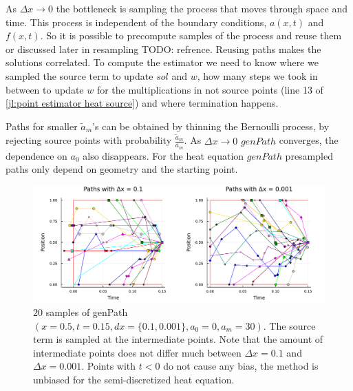 \documentclass[a4paper,12pt]{article}
\begin{document}
\begin{technique} \label{tech:presampling heat}
  As $\Delta x \rightarrow 0$ the bottleneck is sampling the process that moves through space and time.
  This process is independent of the boundary conditions, $a(x,t)$ and $f(x,t)$. So it is possible to
  precompute samples of the process and reuse them or discussed later in resampling TODO: refrence.
  Reusing paths makes the solutions correlated. To compute the estimator we need to know where we sampled the
  source term to update $sol$ and $w$, how many steps we took in between to update $w$ for the
  multiplications in not source points (line 13 of \ref{jl:point estimator heat source})
  and where termination happens.


  Paths for smaller $\tilde{a}_{m}$'s can be obtained by thinning the Bernoulli process,
  by rejecting source points with probability $\frac{\tilde{a}_{m}}{a_{m}}$. As $\Delta x \rightarrow 0$
  $genPath$ converges, the dependence on $a_{0}$ also disappears. For the heat equation
  $genPath$ presampled paths only depend on geometry and the starting point.

  \begin{figure}[h!]
    \centering
    \includegraphics[width=\textwidth]{./julia_plots/paths_pest_heat_varcoef.pdf}
    \caption{$20$ samples of genPath$(x=0.5,t=0.15,dx=\{0.1,0.001\},a_{0}=0,a_{m} = 30)$. The source term is sampled
    at the intermediate points. Note that the amount of
    intermediate points does not differ much between $\Delta x = 0.1$ and $\Delta x = 0.001$.
    Points with $t<0$ do not cause any bias, the method is unbiased for the semi-discretized heat equation. }
    \label{fig:presampled paths pest heat var}
  \end{figure}

\end{technique}
\end{document}
